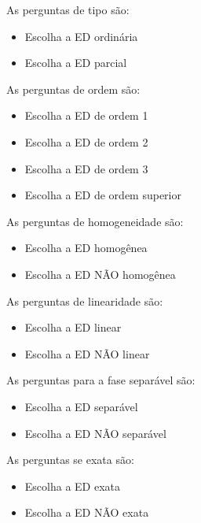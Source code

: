 As perguntas de tipo são: 
\begin{itemize}
	\item{}Escolha a ED ordinária
	\item{}Escolha a ED parcial
\end{itemize}


As perguntas de ordem são:
\begin{itemize}
	\item{}Escolha a ED de ordem 1
	\item{}Escolha a ED de ordem 2
	\item{}Escolha a ED de ordem 3
	\item{}Escolha a ED de ordem superior
\end{itemize}
 	

As perguntas de homogeneidade são:
\begin{itemize}
	\item{}Escolha a ED homogênea
	\item{}Escolha a ED NÃO homogênea
\end{itemize}
					
 
As perguntas de linearidade são:
\begin{itemize}
	\item{}Escolha a ED linear
	\item{}Escolha a ED NÃO linear
\end{itemize} 

As perguntas para a fase separável são:
\begin{itemize}
	\item{}Escolha a ED separável
	\item{}Escolha a ED NÃO separável
\end{itemize}

As perguntas se exata são:
\begin{itemize}
	\item{}Escolha a ED exata
	\item{}Escolha a ED NÃO exata
\end{itemize} 

